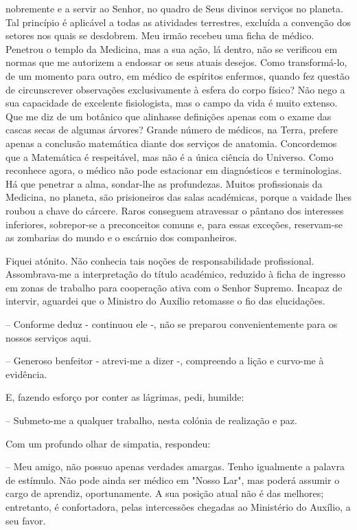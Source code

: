 \documentclass[portuguese,12pt,a4paper]{scrbook}
\begin{document}
	
	nobremente e a servir ao Senhor, no quadro de Seus divinos serviços no planeta. Tal princípio é aplicável a todas as atividades terrestres, excluída a convenção dos setores nos quais se desdobrem. Meu irmão recebeu uma ficha de médico. Penetrou o templo da Medicina, mas a sua ação, lá dentro, não se verificou em normas que me autorizem a endossar os seus atuais desejos. Como transformá-lo, de um momento para outro, em médico de espíritos enfermos, quando fez questão de circunscrever observações exclusivamente à esfera do corpo físico? Não nego a sua capacidade de excelente fisiologista, mas o campo da vida é muito extenso. Que me diz de um botânico que alinhasse definições apenas com o exame das cascas secas de algumas árvores? Grande número de médicos, na Terra, prefere apenas a conclusão matemática diante dos serviços de anatomia. Concordemos que a Matemática é respeitável, mas não é a única ciência do Universo. Como reconhece agora, o médico não pode estacionar em diagnósticos e terminologias. Há que penetrar a alma, sondar-lhe as profundezas. Muitos profissionais da Medicina, no planeta, são prisioneiros das salas académicas, porque a vaidade lhes roubou a chave do cárcere. Raros conseguem atravessar o pântano dos interesses inferiores, sobrepor-se a preconceitos comuns e, para essas exceções, reservam-se as zombarias do mundo e o escárnio dos companheiros.
	
	Fiquei atónito. Não conhecia tais noções de responsabilidade profissional. Assombrava-me a interpretação do título académico, reduzido à ficha de ingresso em zonas de trabalho para cooperação ativa com o Senhor Supremo. Incapaz de intervir, aguardei que o Ministro do Auxílio retomasse o fio das elucidações.
	
	– Conforme deduz - continuou ele -, não se preparou convenientemente para os nossos serviços aqui.
	
	– Generoso benfeitor - atrevi-me a dizer -, compreendo a lição e curvo-me à evidência.
	
	
	E, fazendo esforço por conter as lágrimas, pedi, humilde:
	
	– Submeto-me a qualquer trabalho, nesta colónia de realização e paz.
	
	Com um profundo olhar de simpatia, respondeu:
	
	– Meu amigo, não possuo apenas verdades amargas. Tenho igualmente a palavra de estímulo. Não pode ainda ser médico em "Nosso Lar", mas poderá assumir o cargo de aprendiz, oportunamente. A sua posição atual não é das melhores; entretanto, é confortadora, pelas intercessões chegadas ao Ministério do Auxílio, a seu favor.
	
\end{document}
